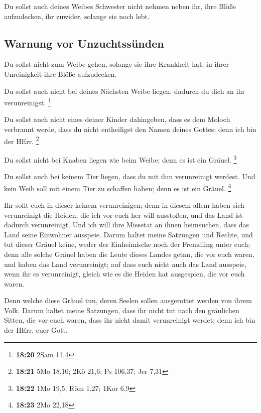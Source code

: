  Du sollst auch deines Weibes Schwester nicht nehmen
neben ihr, ihre Blöße aufzudecken, ihr zuwider, solange sie noch lebt.

\hypertarget{warnung-vor-unzuchtssuxfcnden}{%
\subsection{Warnung vor
Unzuchtssünden}\label{warnung-vor-unzuchtssuxfcnden}}

 Du sollst nicht zum Weibe gehen, solange sie ihre
Krankheit hat, in ihrer Unreinigkeit ihre Blöße aufzudecken.

 Du sollst auch nicht bei deines Nächsten Weibe liegen,
dadurch du dich an ihr verunreinigst. \footnote{\textbf{18:20} 2Sam 11,4}

 Du sollst auch nicht eines deiner Kinder dahingeben,
dass es dem Moloch verbrannt werde, dass du nicht entheiligst den Namen
deines Gottes; denn ich bin der HErr. \footnote{\textbf{18:21} 5Mo
  18,10; 2Kö 21,6; Ps 106,37; Jer 7,31}

 Du sollst nicht bei Knaben liegen wie beim Weibe; denn
es ist ein Gräuel. \footnote{\textbf{18:22} 1Mo 19,5; Röm 1,27; 1Kor 6,9}

 Du sollst auch bei keinem Tier liegen, dass du mit ihm
verunreinigt werdest. Und kein Weib soll mit einem Tier zu schaffen
haben; denn es ist ein Gräuel. \footnote{\textbf{18:23} 2Mo 22,18}

 Ihr sollt euch in dieser keinem verunreinigen; denn in
diesem allem haben sich verunreinigt die Heiden, die ich vor euch her
will ausstoßen,  und das Land ist dadurch verunreinigt.
Und ich will ihre Missetat an ihnen heimsuchen, dass das Land seine
Einwohner ausspeie.  Darum haltet meine Satzungen und
Rechte, und tut dieser Gräuel keine, weder der Einheimische noch der
Fremdling unter euch;  denn alle solche Gräuel haben die
Leute dieses Landes getan, die vor euch waren, und haben das Land
verunreinigt;  auf dass euch nicht auch das Land
ausspeie, wenn ihr es verunreinigt, gleich wie es die Heiden hat
ausgespien, die vor euch waren.

 Denn welche diese Gräuel tun, deren Seelen sollen
ausgerottet werden von ihrem Volk.  Darum haltet meine
Satzungen, dass ihr nicht tut nach den gräulichen Sitten, die vor euch
waren, dass ihr nicht damit verunreinigt werdet; denn ich bin der HErr,
euer Gott.

